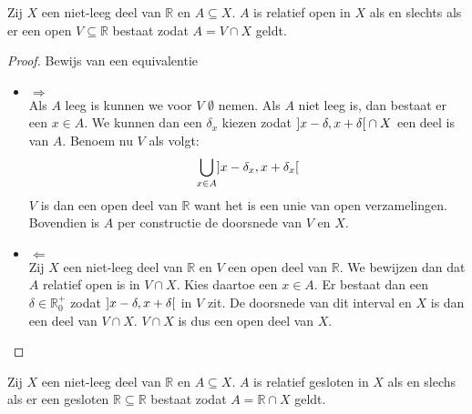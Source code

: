 \documentclass[main.tex]{subfiles}
\begin{document}
\begin{pr}
  Zij $X$ een niet-leeg deel van $\mathbb{R}$ en $A \subseteq X$.
  $A$ is relatief open in $X$ als en slechts als er een open $V\subseteq \mathbb{R}$ bestaat zodat $A=V \cap X$ geldt.

  \begin{proof}
    Bewijs van een equivalentie\\
    \begin{itemize}
    \item $\Rightarrow$\\
      Als $A$ leeg is kunnen we voor $V$ $\emptyset$ nemen.
      Als $A$ niet leeg is, dan bestaat er een $x\in A$.
      We kunnen dan een $\delta_{x}$ kiezen zodat $\interval[open]{x-\delta}{x+\delta} \cap X$ een deel is van $A$.
      Benoem nu $V$ als volgt:
      \[ \bigcup_{x\in A}\interval[open]{x-\delta_{x}}{x+\delta_{x}} \]
      $V$ is dan een open deel van $\mathbb{R}$ want het is een unie van open verzamelingen.
      Bovendien is $A$ per constructie de doorsnede van $V$ en $X$.
    \item $\Leftarrow$\\
      Zij $X$ een niet-leeg deel van $\mathbb{R}$ en $V$ een open deel van $\mathbb{R}$.
      We bewijzen dan dat $A$ relatief open is in $V\cap X$.
      Kies daartoe een $x\in A$. Er bestaat dan een $\delta\in \mathbb{R}_{0}^{+}$ zodat $\interval[open]{x-\delta}{x+\delta}$ in $V$ zit.
      De doorsnede van dit interval en $X$ is dan een deel van $V \cap X$.
      $V\cap X$ is dus een open deel van $X$.
    \end{itemize}
  \end{proof}
\end{pr}

\begin{pr}
  Zij $X$ een niet-leeg deel van $\mathbb{R}$ en $A \subseteq X$.
  $A$ is relatief gesloten in $X$ als en slechs als er een gesloten $\mathbb{R} \subseteq \mathbb{R}$ bestaat zodat $A=\mathbb{R} \cap X$ geldt.
\end{pr}

\end{document}

